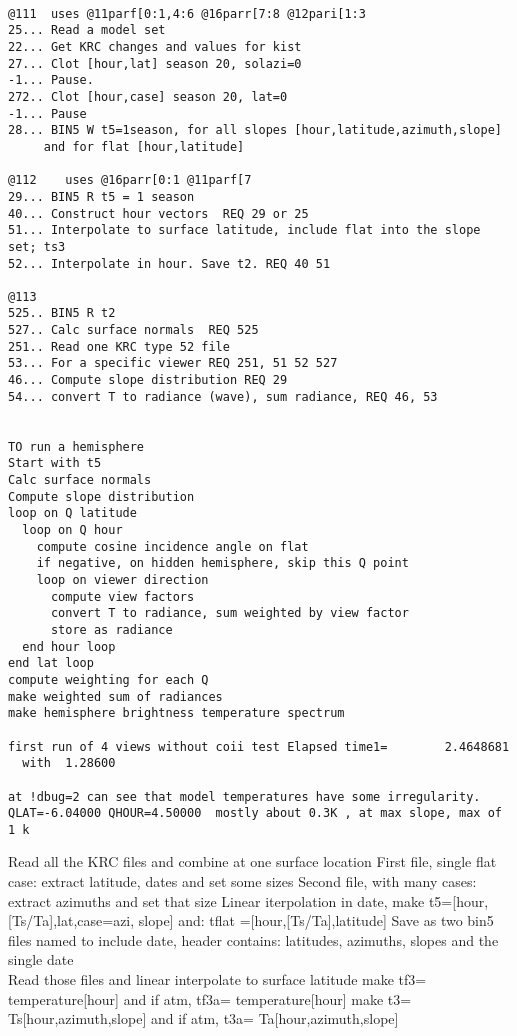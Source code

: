 \documentclass{article}
\begin{document}
\begin{verbatim}

@111  uses @11parf[0:1,4:6 @16parr[7:8 @12pari[1:3
25... Read a model set
22... Get KRC changes and values for kist
27... Clot [hour,lat] season 20, solazi=0
-1... Pause.
272.. Clot [hour,case] season 20, lat=0
-1... Pause
28... BIN5 W t5=1season, for all slopes [hour,latitude,azimuth,slope] 
     and for flat [hour,latitude]

@112    uses @16parr[0:1 @11parf[7
29... BIN5 R t5 = 1 season
40... Construct hour vectors  REQ 29 or 25
51... Interpolate to surface latitude, include flat into the slope set; ts3 
52... Interpolate in hour. Save t2. REQ 40 51

@113
525.. BIN5 R t2   
527.. Calc surface normals  REQ 525 
251.. Read one KRC type 52 file
53... For a specific viewer REQ 251, 51 52 527
46... Compute slope distribution REQ 29
54... convert T to radiance (wave), sum radiance, REQ 46, 53


TO run a hemisphere
Start with t5 
Calc surface normals
Compute slope distribution 
loop on Q latitude
  loop on Q hour
    compute cosine incidence angle on flat
    if negative, on hidden hemisphere, skip this Q point
    loop on viewer direction
      compute view factors
      convert T to radiance, sum weighted by view factor
      store as radiance
  end hour loop
end lat loop
compute weighting for each Q
make weighted sum of radiances
make hemisphere brightness temperature spectrum

first run of 4 views without coii test Elapsed time1=        2.4648681
  with  1.28600

at !dbug=2 can see that model temperatures have some irregularity.
QLAT=-6.04000 QHOUR=4.50000  mostly about 0.3K , at max slope, max of 1 k
\end{verbatim}
\vspace{3mm}
Read all the KRC files and combine at one surface location
\qii First file, single flat case: extract latitude, dates and  set some sizes 
\qii Second file, with many cases: extract azimuths and set that size 
\qi Linear iterpolation in date, make  t5=[hour,[Ts/Ta],lat,case=azi, slope] 
\qi  and: tflat =[hour,[Ts/Ta],latitude]
\qi Save as two bin5 files named to include date, 
\qii header contains: latitudes, azimuths, slopes and the single date
\\ Read those files and linear interpolate to surface latitude
\qi make tf3= temperature[hour] and if atm, tf3a= temperature[hour]
\qi make t3= Ts[hour,azimuth,slope] and if atm, t3a= Ta[hour,azimuth,slope]
\end{document}
